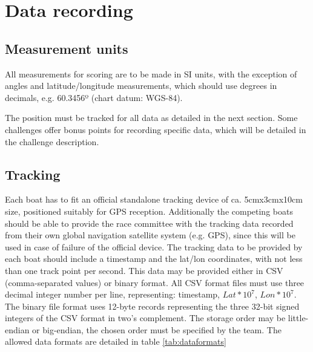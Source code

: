 \documentclass[12pt]{article}
\begin{document}
\section{Data recording}
\subsection{Measurement units}
All measurements for scoring are to be made in SI units, with the exception of
angles and latitude/longitude measurements, which should use degrees in
decimals, e.g. 60.3456º (chart datum: WGS-84).

The position must be tracked for all data as detailed in the next section.
Some challenges offer bonus points for recording specific data, which will be
detailed in the challenge description.

\subsection{Tracking}
Each boat has to fit an official standalone tracking device of ca. 5cmx3cmx10cm
size, positioned suitably for GPS reception. Additionally the competing boats
should be able to provide the race committee with the tracking data recorded
from their own global navigation satellite system (e.g. GPS), since this will be
used in case of failure of the official device.
The tracking data to be provided by each boat should include a timestamp and the
lat/lon coordinates, with not less than one track point per second. 
This data may be provided either in CSV (comma-separated values) or binary format.
All CSV format files must use three decimal integer number per line,
representing: timestamp, $Lat*10^7$, $Lon*10^7$.
The binary file format uses 12-byte records representing the three 
32-bit signed integers of the CSV format in two’s complement. The storage order may be
little-endian or big-endian, the chosen order must be specified by the team.
The allowed data formats are detailed in table \ref{tab:dataformats}
\end{document}

